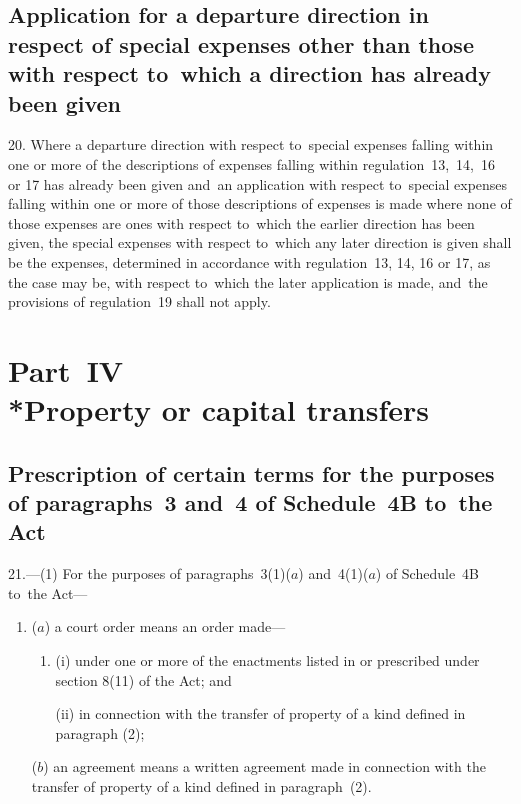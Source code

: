 \documentclass[12pt,a4paper]{article}
\begin{document}
\subsection[20. Application for a departure direction in respect of special expenses other than
those with respect to~which a direction has already been given]{Application for a departure direction in respect of special expenses other than
those with respect to~which a direction has already been given}

20. Where a
departure direction with respect to~special expenses falling within one or more
of the descriptions of expenses falling within regulation~13,~14,~16 or 17 has
already been given and~an application with respect to~special expenses falling
within one or more of those descriptions of expenses is made where none of those
expenses are ones with respect to~which the earlier direction has been given,
the special expenses with respect to~which any later direction is given shall be
the expenses, determined in accordance with regulation~13, 14, 16 or 17, as the
case may be, with respect to~which the later application is made, and~the
provisions of regulation~19 shall not apply.

\section[Part~IV --- Property or capital transfers]{Part~IV\\*Property or capital transfers}

\renewcommand\parthead{--- Part~IV}

\subsection[21. Prescription of certain terms for the
purposes of paragraphs~3 and~4 of Schedule~4B to~the Act]{Prescription of certain terms for the
purposes of paragraphs~3 and~4 of Schedule~4B to~the Act}

21.—(1) For the purposes
of paragraphs~3(1)($a$) and~4(1)($a$) of Schedule~4B to~the Act—
\begin{enumerate}\item[]
($a$) a court order means an order made—
\begin{enumerate}\item[]
(i) under one or more of the enactments listed in or prescribed under section
8(11) of the Act; and

(ii) in connection with the transfer of property of a kind defined in paragraph
(2);
\end{enumerate}

($b$) an agreement means a written agreement made in connection with the transfer
of property of a kind defined in paragraph~(2).
\end{enumerate}
\end{document}
